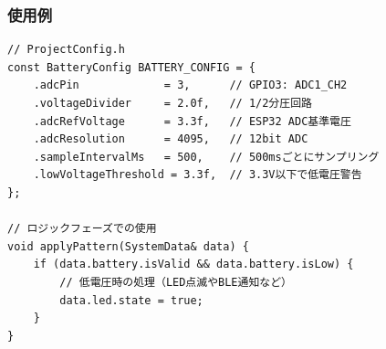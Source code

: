\subsubsection{使用例}

\begin{lstlisting}[style=cppstyle, caption={BatteryModuleの使用例}]
// ProjectConfig.h
const BatteryConfig BATTERY_CONFIG = {
    .adcPin             = 3,      // GPIO3: ADC1_CH2
    .voltageDivider     = 2.0f,   // 1/2分圧回路
    .adcRefVoltage      = 3.3f,   // ESP32 ADC基準電圧
    .adcResolution      = 4095,   // 12bit ADC
    .sampleIntervalMs   = 500,    // 500msごとにサンプリング
    .lowVoltageThreshold = 3.3f,  // 3.3V以下で低電圧警告
};

// ロジックフェーズでの使用
void applyPattern(SystemData& data) {
    if (data.battery.isValid && data.battery.isLow) {
        // 低電圧時の処理（LED点滅やBLE通知など）
        data.led.state = true;
    }
}
\end{lstlisting}
